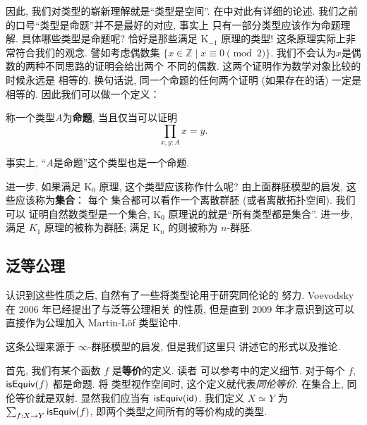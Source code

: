 因此, 我们对类型的崭新理解就是“类型是空间”.
在\cite{ufp:2013:hottbook}中对此有详细的论述.
我们之前的口号“类型是命题”并不是最好的对应, 事实上
只有一部分类型应该作为命题理解.
具体哪些类型是命题呢? 恰好是那些满足 K\(_{-1}\) 原理的类型!
这条原理实际上非常符合我们的观念.
譬如考虑偶数集 \(\{x \in \mathbb Z \mid x \equiv 0 \pmod 2\}\).
我们不会认为\(x\)是偶数的两种不同思路的证明会给出两个
不同的偶数. 这两个证明作为数学对象比较的时候永远是
相等的. 换句话说, 同一个命题的任何两个证明 (如果存在的话)
一定是相等的. 因此我们可以做一个定义：
\begin{definition}
称一个类型\(A\)为\textbf{命题}, 当且仅当可以证明
\[\prod_{x,y:A} x = y.\]
\end{definition}
事实上, “\(A\)是命题”这个类型也是一个命题.

进一步, 如果满足 K\(_0\) 原理, 这个类型应该称作什么呢?
由上面群胚模型的启发, 这些应该称为\textbf{集合}： 每个
集合都可以看作一个离散群胚 (或者离散拓扑空间). 我们可以
证明自然数类型是一个集合,
K\(_0\) 原理说的就是“所有类型都是集合”. 进一步, 满足
\(K_1\) 原理的被称为群胚; 满足 K\(_n\) 的则被称为 \(n\)-群胚.

\subsection{泛等公理}
认识到这些性质之后, 自然有了一些将类型论用于研究同伦论的
努力. Voevodsky 在 2006 年已经提出了与泛等公理相关
的性质, 但是直到 2009 年才意识到这可以直接作为公理加入
Martin-L\"of 类型论中.

这条公理来源于 \(\infty\)-群胚模型的启发, 但是我们这里只
讲述它的形式以及推论.

首先, 我们有某个函数 \(f\) 是\textbf{等价}的定义. 读者
可以参考\cite{escardo:2018:univalence}中的定义细节.
对于每个 \(f\), \(\textsf{isEquiv}(f)\) 都是命题. 将
类型视作空间时, 这个定义就代表\emph{同伦等价}. 在集合上,
同伦等价就是双射. 显然我们应当有 \(\textsf{isEquiv}(\textsf{id})\).
我们定义 \(X\simeq Y\) 为 \(\sum_{f : X \to Y}\textsf{isEquiv}(f)\),
即两个类型之间所有的等价构成的类型.


